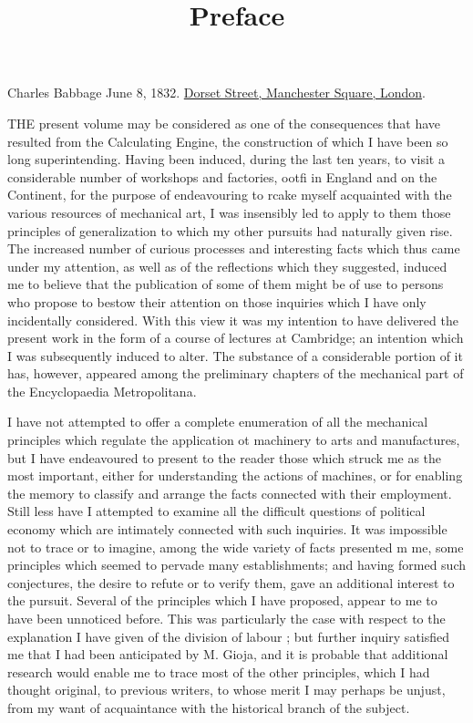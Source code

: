 \documentclass{article}
\begin{document}
\title{Preface}

\maketitle


Charles Babbage June 8, 1832. \href{https://www.openstreetmap.org/#map=19/51.51673/-0.15303}{Dorset Street, Manchester Square, London}.


THE present volume may be considered as one of the consequences that have resulted from the Calculating Engine, the construction of which I have been so long superintending. Having been induced, during the last ten years, to visit a considerable number of workshops and factories, ootfi in England and on the Continent, for the purpose of endeavouring to rcake myself acquainted with the various resources of mechanical art, I was insensibly led to apply to them those principles of generalization to which my other pursuits had naturally given rise. The increased number of curious processes and interesting facts which thus came under my attention, as well as of the reflections which they suggested, induced me to believe that the publication of some of them might be of use to persons who propose to bestow their attention on those inquiries which I have only incidentally considered. With this view it was my intention to have delivered the present work in the form of a course of lectures at Cambridge; an intention which I was subsequently induced to alter. The substance of a considerable portion of it has, however, appeared among the preliminary chapters of the mechanical part of the Encyclopaedia Metropolitana.


I have not attempted to offer a complete enumeration of all the mechanical principles which regulate the application ot machinery to arts and manufactures, but I have endeavoured to present to the reader those which struck me as the most important, either for understanding the actions of machines, or for enabling the memory to classify and arrange the facts connected with their employment. Still less have I attempted to examine all the difficult questions of political economy which are intimately connected with such inquiries. It was impossible not to trace or to imagine, among the wide variety of facts presented m me, some principles which seemed to pervade many establishments; and having formed such conjectures, the desire to refute or to verify them, gave an additional interest to the pursuit. Several of the principles which I have proposed, appear to me to have been unnoticed before. This was particularly the case with respect to the explanation I have given of the division of labour ; but further inquiry satisfied me that I had been anticipated by M. Gioja, and it is probable that additional research would enable me to trace most of the other principles, which I had thought original, to previous writers, to whose merit I may perhaps be unjust, from my want of acquaintance with the historical branch of the subject.
\end{document}
